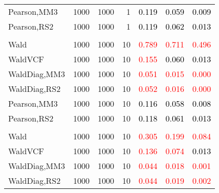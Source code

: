 \documentclass[
]{article}
\begin{document}
\begin{table}[H]
{\begin{tabular}[t]{lrrrrrr}
\hspace{1em}Pearson,MM3 & 1000 & 1000 & 1 & \textcolor{black}{0.119} & \textcolor{black}{0.059} & \textcolor{black}{0.009}\\
\hspace{1em}Pearson,RS2 & 1000 & 1000 & 1 & \textcolor{black}{0.119} & \textcolor{black}{0.062} & \textcolor{black}{0.013}\\
\addlinespace[0.3em]
\multicolumn{7}{l}{\textbf{1F 15V}}\\
\hspace{1em}Wald & 1000 & 1000 & 10 & \textcolor{red}{0.789} & \textcolor{red}{0.711} & \textcolor{red}{0.496}\\
\hspace{1em}WaldVCF & 1000 & 1000 & 10 & \textcolor{red}{0.155} & \textcolor{black}{0.060} & \textcolor{black}{0.013}\\
\hspace{1em}WaldDiag,MM3 & 1000 & 1000 & 10 & \textcolor{red}{0.051} & \textcolor{red}{0.015} & \textcolor{red}{0.000}\\
\hspace{1em}WaldDiag,RS2 & 1000 & 1000 & 10 & \textcolor{red}{0.052} & \textcolor{red}{0.016} & \textcolor{red}{0.000}\\
\hspace{1em}Pearson,MM3 & 1000 & 1000 & 10 & \textcolor{black}{0.116} & \textcolor{black}{0.058} & \textcolor{black}{0.008}\\
\hspace{1em}Pearson,RS2 & 1000 & 1000 & 10 & \textcolor{black}{0.118} & \textcolor{black}{0.061} & \textcolor{black}{0.013}\\
\addlinespace[0.3em]
\multicolumn{7}{l}{\textbf{2F 10V}}\\
\hspace{1em}Wald & 1000 & 1000 & 10 & \textcolor{red}{0.305} & \textcolor{red}{0.199} & \textcolor{red}{0.084}\\
\hspace{1em}WaldVCF & 1000 & 1000 & 10 & \textcolor{red}{0.136} & \textcolor{red}{0.074} & \textcolor{black}{0.013}\\
\hspace{1em}WaldDiag,MM3 & 1000 & 1000 & 10 & \textcolor{red}{0.044} & \textcolor{red}{0.018} & \textcolor{red}{0.001}\\
\hspace{1em}WaldDiag,RS2 & 1000 & 1000 & 10 & \textcolor{red}{0.044} & \textcolor{red}{0.019} & \textcolor{red}{0.002}\\

\end{tabular}}
\end{table}
\end{document}
